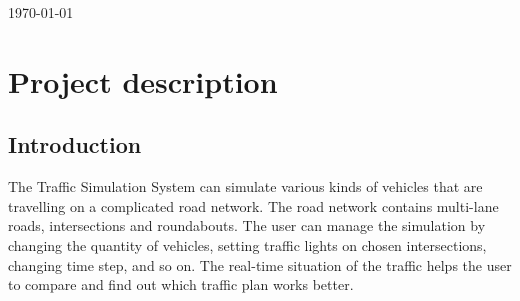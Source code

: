 \documentclass[a4paper,12pt]{article}
\begin{document}
\begin{titlepage}
{\large \today}\\[3cm] %


 

\vfill %

\end{titlepage}


\section{Project description}

\subsection{Introduction}
The Traffic Simulation System can simulate various kinds of vehicles that are travelling on a complicated road network. The road network contains multi-lane roads, intersections and roundabouts. The user can manage the simulation by changing the quantity of vehicles, setting traffic lights on chosen intersections, changing time step, and so on. The real-time situation of the traffic helps the user to compare and find out which traffic plan works better.
\end{document}
